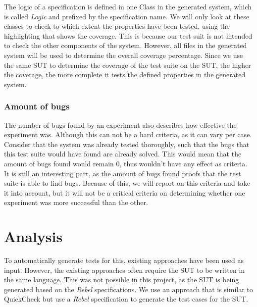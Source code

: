 \FloatBarrier
The logic of a specification is defined in one Class in the generated system, which is called \textit{Logic} and prefixed by the specification name. We will only look at these classes to check to which extent the properties have been tested, using the highlighting that shows the coverage. This is because our test suit is not intended to check the other components of the system. However, all files in the generated system will be used to determine the overall coverage percentage. Since we use the same SUT to determine the coverage of the test suite on the SUT, the higher the coverage, the more complete it tests the defined properties in the generated system.

\subsubsection{Amount of bugs}
The number of bugs found by an experiment also describes how effective the experiment was. Although this can not be a hard criteria, as it can vary per case. Consider that the system was already tested thoroughly, such that the bugs that this test suite would have found are already solved. This would mean that the amount of bugs found would remain 0, thus wouldn't have any effect as criteria. It is still an interesting part, as the amount of bugs found proofs that the test suite is able to find bugs. Because of this, we will report on this criteria and take it into account, but it will not be a critical criteria on determining whether one experiment was more successful than the other.



\section{Analysis}
To automatically generate tests for this, existing approaches have been used as input. However, the existing approaches often require the SUT to be written in the same language. This was not possible in this project, as the SUT is being generated based on the \textit{Rebel} specifications. We use an approach that is similar to QuickCheck but use a \textit{Rebel} specification to generate the test cases for the SUT.\\
\\


